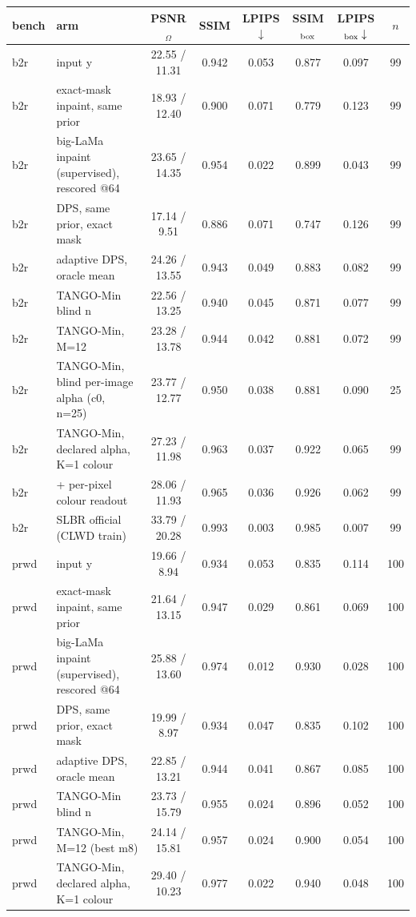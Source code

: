 \begin{tabular}{llcccccc}
\toprule
bench & arm & PSNR$_\Omega$ & SSIM & LPIPS$\downarrow$ & SSIM$_{\rm box}$ & LPIPS$_{\rm box}\downarrow$ & $n$\\
\midrule
b2r & input y & 22.55 / 11.31 & 0.942 & 0.053 & 0.877 & 0.097 & 99\\
b2r & exact-mask inpaint, same prior & 18.93 / 12.40 & 0.900 & 0.071 & 0.779 & 0.123 & 99\\
b2r & big-LaMa inpaint (supervised), rescored @64 & 23.65 / 14.35 & 0.954 & 0.022 & 0.899 & 0.043 & 99\\
b2r & DPS, same prior, exact mask & 17.14 / 9.51 & 0.886 & 0.071 & 0.747 & 0.126 & 99\\
b2r & adaptive DPS, oracle mean & 24.26 / 13.55 & 0.943 & 0.049 & 0.883 & 0.082 & 99\\
b2r & TANGO-Min blind n & 22.56 / 13.25 & 0.940 & 0.045 & 0.871 & 0.077 & 99\\
b2r & TANGO-Min, M=12 & 23.28 / 13.78 & 0.944 & 0.042 & 0.881 & 0.072 & 99\\
b2r & TANGO-Min, blind per-image alpha (c0, n=25) & 23.77 / 12.77 & 0.950 & 0.038 & 0.881 & 0.090 & 25\\
b2r & TANGO-Min, declared alpha, K=1 colour & 27.23 / 11.98 & 0.963 & 0.037 & 0.922 & 0.065 & 99\\
b2r & + per-pixel colour readout & 28.06 / 11.93 & 0.965 & 0.036 & 0.926 & 0.062 & 99\\
b2r & SLBR official (CLWD train) & 33.79 / 20.28 & 0.993 & 0.003 & 0.985 & 0.007 & 99\\
\midrule
prwd & input y & 19.66 / 8.94 & 0.934 & 0.053 & 0.835 & 0.114 & 100\\
prwd & exact-mask inpaint, same prior & 21.64 / 13.15 & 0.947 & 0.029 & 0.861 & 0.069 & 100\\
prwd & big-LaMa inpaint (supervised), rescored @64 & 25.88 / 13.60 & 0.974 & 0.012 & 0.930 & 0.028 & 100\\
prwd & DPS, same prior, exact mask & 19.99 / 8.97 & 0.934 & 0.047 & 0.835 & 0.102 & 100\\
prwd & adaptive DPS, oracle mean & 22.85 / 13.21 & 0.944 & 0.041 & 0.867 & 0.085 & 100\\
prwd & TANGO-Min blind n & 23.73 / 15.79 & 0.955 & 0.024 & 0.896 & 0.052 & 100\\
prwd & TANGO-Min, M=12 (best m8) & 24.14 / 15.81 & 0.957 & 0.024 & 0.900 & 0.054 & 100\\
prwd & TANGO-Min, declared alpha, K=1 colour & 29.40 / 10.23 & 0.977 & 0.022 & 0.940 & 0.048 & 100\\

\end{tabular}

